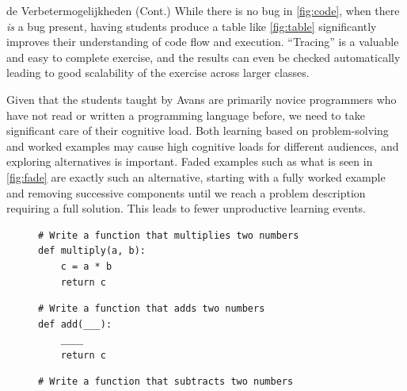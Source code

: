 \documentclass[final]{beamer}
\newlength{\colwidth}
\begin{document}
\begin{frame}[t,fragile]
\begin{columns}[t]
\begin{column}{\colwidth}
\begin{block}{de Verbetermogelijkheden (Cont.)}
      While there is no bug in \cref{fig:code}, when there \emph{is} a bug present, having students produce a table like \cref{fig:table} significantly improves their understanding of code flow and execution\cite{Hertz_2013}. ``Tracing'' is a valuable and easy to complete exercise, and the results can even be checked automatically leading to good scalability of the exercise across larger classes.

      Given that the students taught by Avans are primarily novice programmers who have not read or written a programming language before, we need to take significant care of their cognitive load. Both learning based on problem-solving and worked examples may cause high cognitive loads for different audiences, and exploring alternatives is important\cite{Retnowati_2017}. Faded examples such as what is seen in \cref{fig:fade} are exactly such an alternative, starting with a fully worked example and removing successive components until we reach a problem description requiring a full solution. This leads to fewer unproductive learning events\cite{Renkl_2004}.

\begin{figure}[ht]
    \begin{minipage}[b]{\linewidth}
\begin{lstlisting}
# Write a function that multiplies two numbers
def multiply(a, b):
    c = a * b
    return c
\end{lstlisting}
    \end{minipage}

    \begin{minipage}[b]{\linewidth}
\begin{lstlisting}
# Write a function that adds two numbers
def add(___):
    ____
    return c
\end{lstlisting}
    \end{minipage}

    \begin{minipage}[b]{\linewidth}
\begin{lstlisting}
# Write a function that subtracts two numbers
\end{lstlisting}
    \end{minipage}


\end{figure}
\end{block}
\end{column}
\end{columns}
\end{frame}
\end{document}
